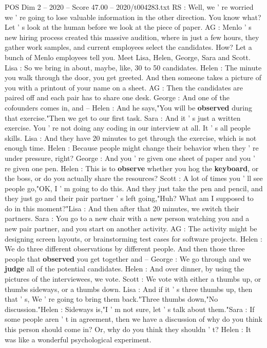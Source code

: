 \begin{textsample}{POS Dim 2 – 2020 – Score 47.00 – 2020/t004283.txt}
RS : Well, we ' re worried we ' re going to lose valuable information in the other direction.
You know what?
Let ' s look at the human before we look at the piece of paper.
AG : Menlo ' s new hiring process created this massive audition, where in just a few hours, they gather work samples, and current employees select the candidates.
How?
Let a bunch of Menlo employees tell you.
Meet Lisa, Helen, George, Sara and Scott.
Lisa : So we bring in about, maybe, like, 30 to 50 candidates.
Helen : The minute you walk through the door, you get greeted.
And then someone takes a picture of you with a printout of your name on a sheet.
AG : Then the candidates are paired off and each pair has to share one desk.
George : And one of the cofounders comes in, and -- Helen : And he says,"You will be \textbf{observed} during that exercise."Then we get to our first task.
Sara : And it ' s just a written exercise.
You ' re not doing any coding in our interview at all.
It ' s all people skills.
Lisa : And they have 20 minutes to get through the exercise, which is not enough time.
Helen : Because people might change their behavior when they ' re under pressure, right?
George : And you ' re given one sheet of paper and you ' re given one pen.
Helen : This is to \textbf{observe} whether you hog the \textbf{keyboard}, or the boss, or do you actually share the resources?
Scott : A lot of times you ' ll see people go,"OK, I ' m going to do this.
And they just take the pen and pencil, and they just go and their pair partner ' s left going,"Huh?
What am I supposed to do in this moment?"Lisa : And then after that 20 minutes, we switch their partners.
Sara : You go to a new chair with a new person watching you and a new pair partner, and you start on another activity.
AG : The activity might be designing screen layouts, or brainstorming test cases for software projects.
Helen : We do three different observations by different people.
And then those three people that \textbf{observed} you get together and -- George : We go through and we \textbf{judge} all of the potential candidates.
Helen : And over dinner, by using the pictures of the interviewees, we vote.
Scott : We vote with either a thumbs up, or thumbs sideways, or a thumbs down.
Lisa : And if it ' s three thumbs up, then that ' s, We ' re going to bring them back."Three thumbs down,"No discussion."Helen : Sideways is,"I ' m not sure, let ' s talk about them."Sara : If some people aren ' t in agreement, then we have a discussion of why do you think this person should come in?
Or, why do you think they shouldn ' t?
Helen : It was like a wonderful psychological experiment.

\end{textsample}
